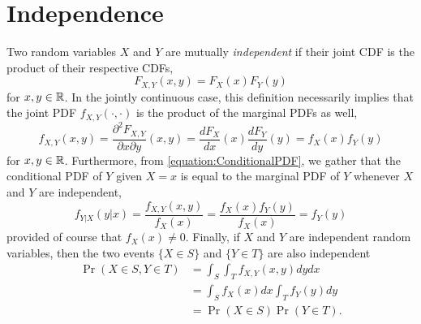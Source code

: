 \section{Independence}

Two random variables $X$ and $Y$ are mutually \emph{independent} if their joint CDF is the product of their respective CDFs, 
\begin{equation*}
F_{X,Y} (x,y) = F_X (x) F_Y(y)
\end{equation*}
for $x, y \in \mathbb{R}$.
In the jointly continuous case, this definition necessarily implies that the joint PDF $f_{X,Y}(\cdot, \cdot)$ is the product of the marginal PDFs as well,
\begin{equation*}
f_{X,Y} (x,y) = \frac{\partial^2 F_{X,Y}}{\partial x \partial y} (x, y)
= \frac{d F_X}{dx} (x) \frac{d F_Y}{dy} (y)
= f_X (x) f_Y (y)
\end{equation*}
for $x, y \in \mathbb{R}$.
Furthermore, from \eqref{equation:ConditionalPDF}, we gather that the conditional PDF of $Y$ given $X=x$ is equal to the marginal PDF of $Y$ whenever $X$ and $Y$ are independent,
\begin{equation*}
f_{Y|X} (y|x) = \frac{f_{X,Y} (x, y)}{f_X(x)}
= \frac{f_X (x) f_Y (y)}{f_X(x)} = f_Y (y)
\end{equation*}
provided of course that $f_X(x) \neq 0$.
Finally, if $X$ and $Y$ are independent random variables, then the two events $\{ X \in S \}$ and $\{ Y \in T \}$ are also independent
\begin{equation*}
\begin{split}
\Pr (X \in S, Y \in T) &= \int_S \int_T f_{X,Y} (x,y) dy dx \\
&= \int_S f_X (x) dx \int_T f_Y (y) dy \\
&= \Pr (X \in S) \Pr (Y \in T).
\end{split}
\end{equation*}

